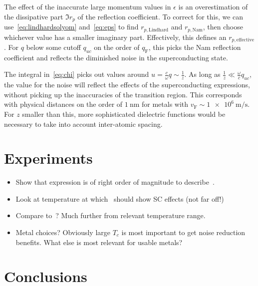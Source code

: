 \documentclass{article}
\newcommand{\vf}{v_{\mathrm{F}}}
\begin{document}
	The effect of the inaccurate large momentum values in $\epsilon$ is an overestimation of the dissipative part $\Im r_p$ of the reflection coefficient.
	To correct for this, we can use~\eqref{eq:lindhardsolyom} and~\eqref{eq:eps} to find $r_{p\mathrm{, Lindhard}}$ and $r_{p\mathrm{, Nam}}$, then choose whichever value has a smaller imaginary part.
	Effectively, this defines an $r_{p\mathrm{, effective}}$.
	For $q$ below some cutoff $q_{uc}$ on the order of $q_{\mathrm{F}}$, this picks the Nam reflection coefficient and reflects the diminished noise in the superconducting state.

	The integral in~\eqref{eq:chi} picks out values around $u = \frac{c}{\omega} q \sim \frac{1}{z}$.
	As long as $\frac{1}{z} \ll \frac{\omega}{c} q_{uc}$, the value for the noise will reflect the effects of the superconducting expressions, without picking up the inaccuracies of the transition region.
	This corresponds with physical distances on the order of $\SI{1}{\nm}$ for metals with $\vf \sim \SI{1e6}{\m\per\s}$.
	For $z$ smaller than this, more sophisticated dielectric functions would be necessary to take into account inter-atomic spacing.

\section{Experiments \label{sec:experiments}}
\begin{itemize}
	\item Show that expression is of right order of magnitude to describe~\cite{Tenberg2019}.
	\item Look at temperature at which~\cite{Tenberg2019} should show SC effects (not far off!)
	\item Compare to~\cite{Kolkowitz2015}?
	Much further from relevant temperature range.
	\item Metal choices?
	Obviously large $T_c$ is most important to get noise reduction benefits.
	What else is most relevant for usable metals?
\end{itemize}
\section{Conclusions \label{sec:conclusions}}

\printbibliography
\end{document}
